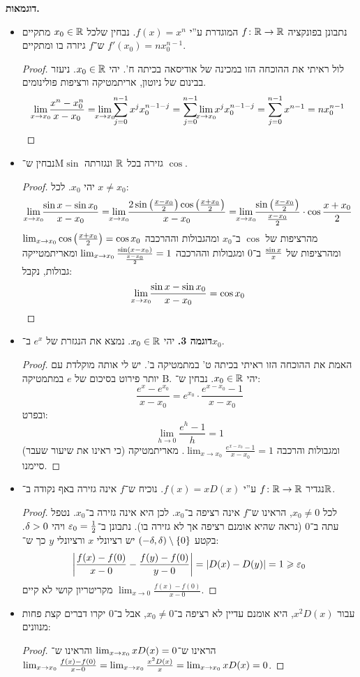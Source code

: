\documentclass[name=רשימות חשבון דיפרנציאלי ואינטגרלי 1א]{../../../tex/classes/megasumPreamble}
\newcommand\tfl     {\lim_{\mathclap{x \to x_0}}}
\begin{document}
	\textbf{דוגמאות. }
	\begin{itemize}
		\item נתבונן בפונקציה $f \colon \mathbb{R} \to \mathbb{R}$ המוגדרת ע''י $f(x) = x^{n}$. נבחין שלכל $x_0 \in \mathbb{R}$ מתקיים ש־$f$ גיזרה בו ומתקיים $f'(x_0) = nx_0^{n - 1}$.
		\begin{proof}
			לול ראיתי את ההוכחה הזו במכינה של אודיסאה בכיתה ח'. יהי $x_0 \in \mathbb{R}$. ניעזר בבינום של ניוטון, אריתמטיקה ורציפות פולינומים.
			\[ \lim_{\mathclap{x \to x_0}} \frac{x^{n} - x_0^{n}}{x - x_0} = \lim_{\mathclap{x \to x_0}} \sum_{j = 0}^{n - 1}x^{j}x_0^{n - 1 - j} = \sum_{j = 0}^{n - 1}\lim_{\mathclap{x \to x_0}}x^{j}x_0^{n - 1 - j} = \sum_{j = 0}^{n - 1}x^{n - 1} = nx_0^{n - 1} \]
		\end{proof}
		\item נבחין ש־M$\sin$ גזירה בכל $\mathbb{R}$ ונגזרתה $\cos$. \begin{proof}
			יהי $x_0$. לכל $x \neq x_0$:
			\[ \tfl \frac{\sinx - \sin x_0}{x - x_0} = \tfl \frac{2\sin\cl{\frac{x - x_0}{2}}\cos\cl{\frac{x + x_0}{2}}}{x - x_0} = \tfl \frac{\sin\cl{\frac{x - x_0}{2}}}{\frac{x - x_0}{2}} \cdot \cos{\frac{x + x_0}{2}} \]
			מהרציפות של $\cos$ ב־$x_0$ ומהגבולות וההרכבה $\lim_{x \to x_0} \cos\left ( \frac{x + x_0}{2} \right ) = \cos x_0$ ומהרציפות של $\frac{\sin x}{x}$ ב־$0$ ומגבולות וההרכבה $\lim_{x \to x_0}\frac{\sin\left ( x - x_0 \right )}{\frac{x - x_0}{2}} = 1$ ומאריתמטייקה גבולות, נקבל:
			\[ \tfl \frac{\sinx - \sin x_0}{x - x_0} = \cos x_0 \]
		\end{proof}

		\item \textbf{דוגמה 3. }יהי $x_0 \in \mathbb{R}$. נמצא את הנגזרת של $e^{x}$ ב־$x_0$.
		\begin{proof}
			האמת את ההוכחה הזו ראיתי בכיתה ט' במתמטיקה ב'. יש לי אותה מוקלדת עם יותר פירוט בסיכום של $e$ במתמטיקה B. יהי $x_0 \in \mathbb{R}$. נבחין ש־:
			\[ \frac{e^{x} - e^{x_0}}{x - x_0} = e^{x_0} \cdot \frac{e^{x - x_0} - 1}{x - x_0} \]
			ובפרט:
			\[ \lim_{h \to 0} \frac{e^{h} - 1}{h} = 1 \]
			(כי ראינו את שיעור שעבר) ומגבולות והרכבה $\lim_{x \to x_0} \frac{e^{x - x_0} - 1}{x - x_0} = 1$. מאריתמטיקה סיימנו.
		\end{proof}
		\item נגדיר $f \colon \mathbb{R}\to \mathbb{R}$ ע''י $f(x) = xD(x)$. נוכיח ש־$f$ אינה גזירה באף נקודה ב־$\mathbb{R}$. \begin{proof}
			לכל $x_0 \neq 0$, הראינו ש־$f$ אינה רציפה ב־$x_0$. לכן היא אינה גזירה ב־$x_0$. נטפל עתה ב־$0$ (נראה שהיא אומנם רציפה אך לא גזירה בו). נתבונן ב־$\eg_0 = \frac{1}{2}$ ויהי $\delta > 0$. בקטע $(-\delta, \delta) \setminus \{0\}$  יש רציונלי $x$ ורציונלי $y$ כך ש־:
			\[ \sof{\frac{f(x) - f(0)}{x - 0} - \frac{f(y) - f(0)}{y - 0}} = \sof{D(x) - D(y)} = 1 \ge \eg_0 \]
			מקריטריון קושי לא קיים $\lim_{x \to 0} \frac{f(x) - f(0)}{x - 0}$.
		\end{proof}
		\item עבור $x^{2}D(x)$, היא אומנם עדיין לא רציפה ב־$x_0 \neq 0$, אבל ב־$0$ יקרו דברים קצת פחות מנוונים:
		\begin{proof}
			הראינו ש־$\lim_{x \to x_0} xD(x) = 0$ והראינו ש־$\lim_{x \to x_0} \frac{f(x) - f(0)}{x- 0} = \lim_{x \to x_0} \frac{x^{2}D(x)}{x} = \lim_{x \to x_0} xD(x) = 0$.
		\end{proof}
	\end{itemize}
\end{document}
